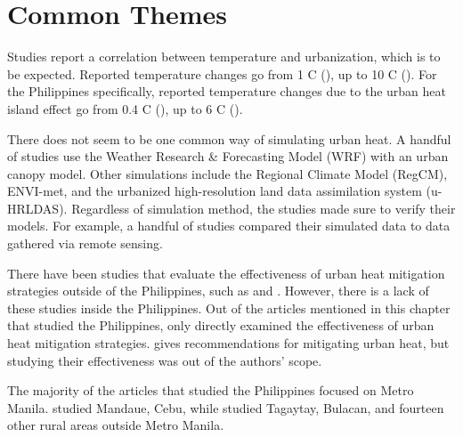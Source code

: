 \section{Common Themes}
	Studies report a correlation between temperature and urbanization, which is to be expected.
	Reported temperature changes go from 1 \degree C (\cite{Huszar2018a}), 
		up to 10 \degree C (\cite{Santamouris2020}).
	For the Philippines specifically, reported temperature changes due to the urban heat island effect go from 0.4 \degree C (\cite{Oliveros2019}),
		up to 6 \degree C (\cite{Purio2022}).
	
	There does not seem to be one common way of simulating urban heat.
	A handful of studies use the Weather Research \& Forecasting Model (WRF) with an urban canopy model.
	Other simulations include the Regional Climate Model (RegCM), 
		ENVI-met, and
		the urbanized high-resolution land data assimilation system (u-HRLDAS).
	Regardless of simulation method, the studies made sure to verify their models. For example, a handful of studies compared their simulated data to data gathered via remote sensing.
	
	There have been studies that evaluate the effectiveness of urban heat mitigation strategies outside of the Philippines, such as \textcite{Gao2019} and \textcite{Gao2020}. 
	However, there is a lack of these studies inside the Philippines.
	Out of the articles mentioned in this chapter that studied the Philippines, only \textcite{Cortes2022} directly examined the effectiveness of urban heat mitigation strategies.
	\textcite{Purio2022} gives recommendations for mitigating urban heat, but studying their effectiveness was out of the authors' scope.
	
	The majority of the articles that studied the Philippines focused on Metro Manila.
	\textcite{Cortes2022} studied Mandaue, Cebu, while \textcite{Oliveros2019} studied Tagaytay, Bulacan, and fourteen other rural areas outside Metro Manila.
	
		
